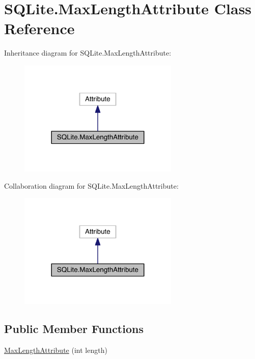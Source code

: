 \hypertarget{class_s_q_lite_1_1_max_length_attribute}{\section{S\+Q\+Lite.\+Max\+Length\+Attribute Class Reference}
\label{class_s_q_lite_1_1_max_length_attribute}
}


Inheritance diagram for S\+Q\+Lite.\+Max\+Length\+Attribute\+:
\nopagebreak
\begin{figure}[H]
\begin{center}
\leavevmode
\includegraphics[width=216pt]{class_s_q_lite_1_1_max_length_attribute__inherit__graph}
\end{center}
\end{figure}


Collaboration diagram for S\+Q\+Lite.\+Max\+Length\+Attribute\+:
\nopagebreak
\begin{figure}[H]
\begin{center}
\leavevmode
\includegraphics[width=216pt]{class_s_q_lite_1_1_max_length_attribute__coll__graph}
\end{center}
\end{figure}
\subsection*{Public Member Functions}
\begin{DoxyCompactItemize}
\item 
\hyperlink{class_s_q_lite_1_1_max_length_attribute_ade550746d23ce2d766d0e1debe57c606}{Max\+Length\+Attribute} (int length)
\end{DoxyCompactItemize}
